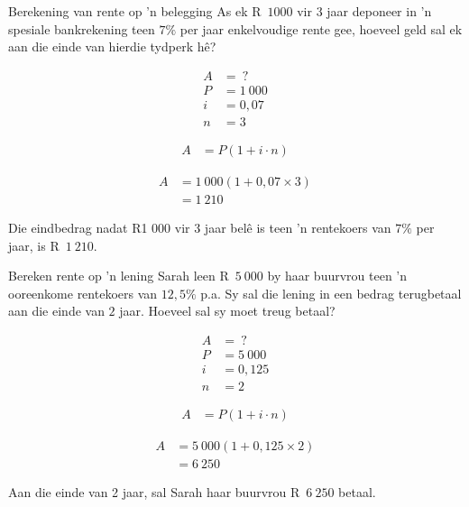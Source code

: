 \begin{wex}{Berekening van rente op 'n belegging}{
    As ek R~$1 000$ vir 3 jaar deponeer
in ’n spesiale bankrekening teen $7\%$ per jaar enkelvoudige rente gee,
hoeveel geld sal ek aan die einde van hierdie tydperk hê?}{

    \begin{align*}
	A &= ~?\\
	P &= 1~000\\
	i &= 0,07\\
	n &= 3
    \end{align*}
    
    \begin{align*}
	A &= P(1 + i \cdot n)
    \end{align*}

    \begin{align*}
	A &= 1~000(1 + 0,07 \times 3)\\
	  &= 1~210
    \end{align*}

    Die eindbedrag nadat R1 000 vir 3 jaar belê is teen ’n rentekoers
van $7\%$ per jaar, is R~$1~210$.
    }
\end{wex}


\begin{wex}{Bereken rente op 'n lening}{
    Sarah leen R~$5~000$ by haar buurvrou teen 'n ooreenkome rentekoers van $12,5\%$ p.a. Sy sal die lening in een bedrag terugbetaal aan die einde van $2$ jaar. Hoeveel sal sy moet treug betaal?}{

    \begin{align*}
	A &= ~?\\
	P &= 5~000\\
	i &= 0,125\\
	n &= 2
    \end{align*}

    \begin{align*}
	A &= P(1 + i \cdot n)
    \end{align*}

    \begin{align*}
	A &= 5~000(1 + 0,125 \times 2)\\
	  &= 6~250
    \end{align*}

    Aan die einde van 2 jaar, sal Sarah haar buurvrou R~$6~250$ betaal.
    }
\end{wex}


